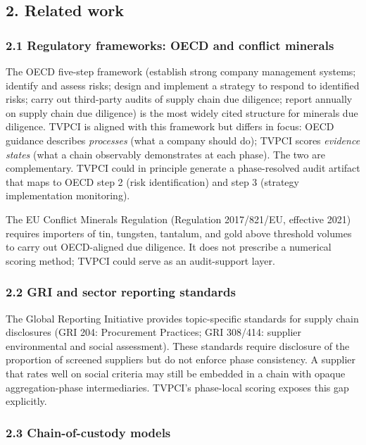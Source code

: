 \documentclass[
  11pt,
  letterpaper,
]{article}
\begin{document}
\subsection{2. Related work}\label{related-work}

\subsubsection{2.1 Regulatory frameworks: OECD and conflict
minerals}\label{regulatory-frameworks-oecd-and-conflict-minerals}

The OECD five-step framework (establish strong company management
systems; identify and assess risks; design and implement a strategy to
respond to identified risks; carry out third-party audits of supply
chain due diligence; report annually on supply chain due diligence) is
the most widely cited structure for minerals due diligence. TVPCI is
aligned with this framework but differs in focus: OECD guidance
describes \emph{processes} (what a company should do); TVPCI scores
\emph{evidence states} (what a chain observably demonstrates at each
phase). The two are complementary. TVPCI could in principle generate a
phase-resolved audit artifact that maps to OECD step 2 (risk
identification) and step 3 (strategy implementation monitoring).

The EU Conflict Minerals Regulation (Regulation 2017/821/EU, effective
2021) requires importers of tin, tungsten, tantalum, and gold above
threshold volumes to carry out OECD-aligned due diligence. It does not
prescribe a numerical scoring method; TVPCI could serve as an
audit-support layer.

\subsubsection{2.2 GRI and sector reporting
standards}\label{gri-and-sector-reporting-standards}

The Global Reporting Initiative provides topic-specific standards for
supply chain disclosures (GRI 204: Procurement Practices; GRI 308/414:
supplier environmental and social assessment). These standards require
disclosure of the proportion of screened suppliers but do not enforce
phase consistency. A supplier that rates well on social criteria may
still be embedded in a chain with opaque aggregation-phase
intermediaries. TVPCI's phase-local scoring exposes this gap explicitly.

\subsubsection{2.3 Chain-of-custody
models}\label{chain-of-custody-models}
\end{document}
